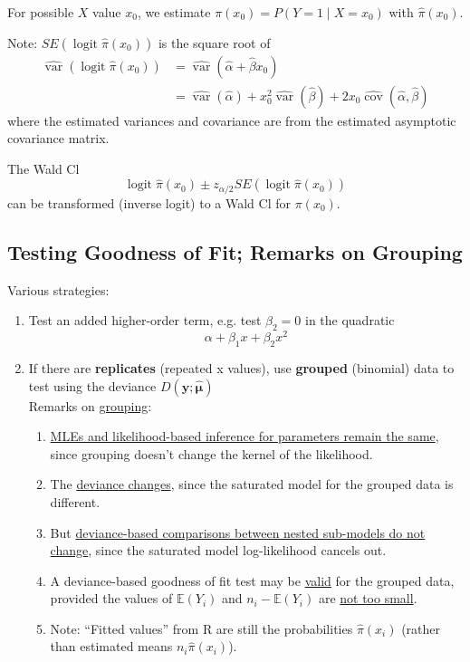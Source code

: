\documentclass[11pt]{elegantbook}
\begin{document}
For possible $X$ value $x_0$, we estimate $\pi(x_0)=P(Y=1\mid X=x_0)$ with $\hat{\pi}(x_0)$.

Note: $S E\left(\operatorname{logit} \hat{\pi}\left(x_0\right)\right)$ is the square root of
$$
\begin{aligned}
\widehat{\operatorname{var}}\left(\operatorname{logit} \hat{\pi}\left(x_0\right)\right) & =\widehat{\operatorname{var}}\left(\hat{\alpha}+\hat{\beta} x_0\right) \\
& =\widehat{\operatorname{var}}(\hat{\alpha})+x_0^2 \widehat{\operatorname{var}}(\hat{\beta})+2 x_0 \widehat{\operatorname{cov}}(\hat{\alpha}, \hat{\beta})
\end{aligned}
$$
where the estimated variances and covariance are from the estimated asymptotic covariance matrix.

The Wald Cl
$$
\operatorname{logit} \hat{\pi}\left(x_0\right) \pm z_{\alpha / 2} S E\left(\operatorname{logit} \hat{\pi}\left(x_0\right)\right)
$$
can be transformed (inverse logit) to a Wald $\mathrm{Cl}$ for $\pi\left(x_0\right)$.

\subsection{Testing Goodness of Fit; Remarks on Grouping}
Various strategies:
\begin{enumerate}[$\bullet$]
    \item Test an added higher-order term, e.g. test $\beta_2 = 0$ in the quadratic $$\alpha + \beta_1 x + \beta_2 x^2$$
    \item If there are \textbf{replicates} (repeated x values), use \textbf{grouped}
    (binomial) data to test using the deviance $D(\boldsymbol{y} ; \hat{\boldsymbol{\mu}})$\\
    Remarks on \underline{grouping}:
    \begin{enumerate}[1.]
        \item \underline{MLEs and likelihood-based inference for parameters remain the same}, since grouping doesn't change the kernel of the likelihood.
        \item The \underline{deviance changes}, since the saturated model for the grouped data is different.
        \item But \underline{deviance-based comparisons between nested sub-models do not change}, since the saturated model log-likelihood cancels out.
        \item A deviance-based goodness of fit test may be \underline{valid} for the grouped data, provided the values of $\mathbb{E}(Y_i)$ and $n_i - \mathbb{E}(Y_i)$ are \underline{not too small}.
        \item Note: “Fitted values” from R are still the probabilities $\hat{\pi}(x_i)$ (rather than estimated means $n_i\hat{\pi}(x_i)$).
    \end{enumerate}
\end{enumerate}
\end{document}
